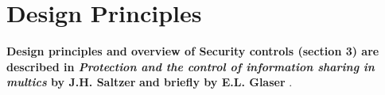 



\section{Design Principles}
\textbf{
Design principles and overview of Security controls (section 3) are described in \textit{Protection and the control of information sharing in multics}
by J.H. Saltzer} \cite{protectionSaltzer} \textbf{and briefly by E.L. Glaser} \cite{protectionGlaser}.


